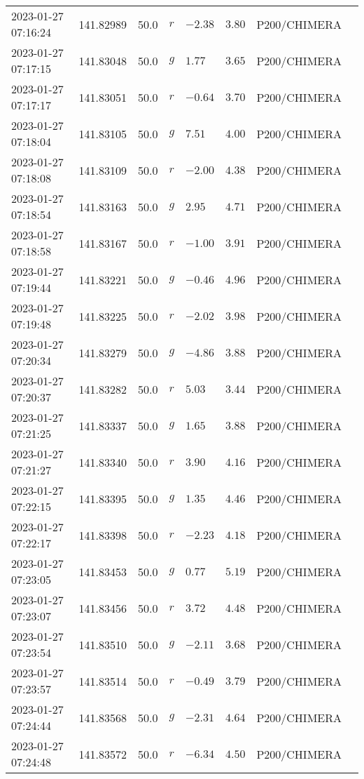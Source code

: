 \documentclass{nature_plusfigure}
\begin{document}
\begin{supplement}
\begin{center}
\begin{longtable}{llllllll}
2023-01-27 07:16:24 & 141.82989 & 50.0 & $r$ & $-2.38$ & $3.80$ & P200/CHIMERA &  \\ 
2023-01-27 07:17:15 & 141.83048 & 50.0 & $g$ & $1.77$ & $3.65$ & P200/CHIMERA &  \\ 
2023-01-27 07:17:17 & 141.83051 & 50.0 & $r$ & $-0.64$ & $3.70$ & P200/CHIMERA &  \\ 
2023-01-27 07:18:04 & 141.83105 & 50.0 & $g$ & $7.51$ & $4.00$ & P200/CHIMERA &  \\ 
2023-01-27 07:18:08 & 141.83109 & 50.0 & $r$ & $-2.00$ & $4.38$ & P200/CHIMERA &  \\ 
2023-01-27 07:18:54 & 141.83163 & 50.0 & $g$ & $2.95$ & $4.71$ & P200/CHIMERA &  \\ 
2023-01-27 07:18:58 & 141.83167 & 50.0 & $r$ & $-1.00$ & $3.91$ & P200/CHIMERA &  \\ 
2023-01-27 07:19:44 & 141.83221 & 50.0 & $g$ & $-0.46$ & $4.96$ & P200/CHIMERA &  \\ 
2023-01-27 07:19:48 & 141.83225 & 50.0 & $r$ & $-2.02$ & $3.98$ & P200/CHIMERA &  \\ 
2023-01-27 07:20:34 & 141.83279 & 50.0 & $g$ & $-4.86$ & $3.88$ & P200/CHIMERA &  \\ 
2023-01-27 07:20:37 & 141.83282 & 50.0 & $r$ & $5.03$ & $3.44$ & P200/CHIMERA &  \\ 
2023-01-27 07:21:25 & 141.83337 & 50.0 & $g$ & $1.65$ & $3.88$ & P200/CHIMERA &  \\ 
2023-01-27 07:21:27 & 141.83340 & 50.0 & $r$ & $3.90$ & $4.16$ & P200/CHIMERA &  \\ 
2023-01-27 07:22:15 & 141.83395 & 50.0 & $g$ & $1.35$ & $4.46$ & P200/CHIMERA &  \\ 
2023-01-27 07:22:17 & 141.83398 & 50.0 & $r$ & $-2.23$ & $4.18$ & P200/CHIMERA &  \\ 
2023-01-27 07:23:05 & 141.83453 & 50.0 & $g$ & $0.77$ & $5.19$ & P200/CHIMERA &  \\ 
2023-01-27 07:23:07 & 141.83456 & 50.0 & $r$ & $3.72$ & $4.48$ & P200/CHIMERA &  \\ 
2023-01-27 07:23:54 & 141.83510 & 50.0 & $g$ & $-2.11$ & $3.68$ & P200/CHIMERA &  \\ 
2023-01-27 07:23:57 & 141.83514 & 50.0 & $r$ & $-0.49$ & $3.79$ & P200/CHIMERA &  \\ 
2023-01-27 07:24:44 & 141.83568 & 50.0 & $g$ & $-2.31$ & $4.64$ & P200/CHIMERA &  \\ 
2023-01-27 07:24:48 & 141.83572 & 50.0 & $r$ & $-6.34$ & $4.50$ & P200/CHIMERA &  \\ 

\end{longtable}
\end{center}
\end{supplement}
\end{document}
